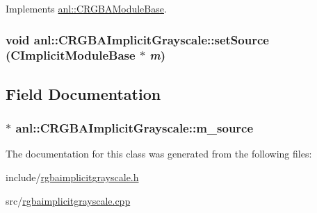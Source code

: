 Implements \hyperlink{classanl_1_1CRGBAModuleBase_afb6896d38ae92b9bb784fe5dc731ae67}{anl::CRGBAModuleBase}.\hypertarget{classanl_1_1CRGBAImplicitGrayscale_a26bc9403b469e7cb8dbb2c7645069aae}{
\subsubsection[{setSource}]{\setlength{\rightskip}{0pt plus 5cm}void anl::CRGBAImplicitGrayscale::setSource ({\bf CImplicitModuleBase} $\ast$ {\em m})}}
\label{classanl_1_1CRGBAImplicitGrayscale_a26bc9403b469e7cb8dbb2c7645069aae}


\subsection{Field Documentation}
\hypertarget{classanl_1_1CRGBAImplicitGrayscale_ab886a59904847ae8b7b9f4dc267e86e5}{
\subsubsection[{m\_\-source}]{$\ast$ {\bf anl::CRGBAImplicitGrayscale::m\_\-source}}}
\label{classanl_1_1CRGBAImplicitGrayscale_ab886a59904847ae8b7b9f4dc267e86e5}


The documentation for this class was generated from the following files:\begin{DoxyCompactItemize}
\item 
include/\hyperlink{rgbaimplicitgrayscale_8h}{rgbaimplicitgrayscale.h}\item 
src/\hyperlink{rgbaimplicitgrayscale_8cpp}{rgbaimplicitgrayscale.cpp}\end{DoxyCompactItemize}
